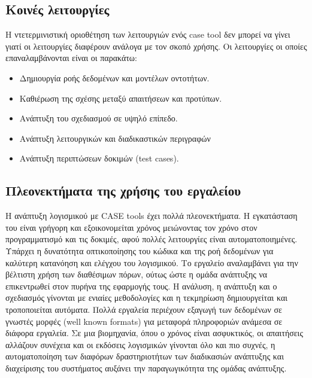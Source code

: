 \subsection{Kοινές λειτουργίες}
Η ντετερμινιστική οριοθέτηση των λειτουργιών ενός case tool δεν μπορεί να γίνει γιατί οι λειτουργίες διαφέρουν ανάλογα με τον σκοπό χρήσης. Οι λειτουργίες οι οποίες επαναλαμβάνονται είναι οι παρακάτω:
\begin{itemize}
	\item Δημιουργία ροής δεδομένων και μοντέλων οντοτήτων.
	\item Καθιέρωση της σχέσης μεταξύ απαιτήσεων και προτύπων.
	\item Ανάπτυξη του σχεδιασμού σε υψηλό επίπεδο.
	\item Ανάπτυξη λειτουργικών και διαδικαστικών περιγραφών
	\item Ανάπτυξη περιπτώσεων δοκιμών (test cases).	
\end{itemize}

\subsection{Πλεονεκτήματα της χρήσης του εργαλείου}
H ανάπτυξη λογισμικού με CASE tools έχει πολλά πλεονεκτήματα. Η εγκατάσταση του είναι γρήγορη και εξοικονομείται χρόνος μειώνοντας τον χρόνο στον προγραμματισμό και τις δοκιμές, αφού πολλές λειτουργίες είναι αυτοματοποιημένες. Υπάρχει η δυνατότητα οπτικοποίησης του κώδικα και της ροή δεδομένων για καλύτερη κατανόηση και ελέγχου του λογισμικού. Το εργαλείο αναλαμβάνει για την βέλτιστη χρήση των διαθέσιμων πόρων, ούτως ώστε η ομάδα ανάπτυξης να επικεντρωθεί στον πυρήνα της εφαρμογής τους. Η ανάλυση, η ανάπτυξη και ο σχεδιασμός γίνονται με ενιαίες μεθοδολογίες και η τεκμηρίωση δημιουργείται και τροποποιείται αυτόματα. Πολλά εργαλεία περιέχουν εξαγωγή των δεδομένων σε γνωστές μορφές (well known formats) για μεταφορά πληροφοριών ανάμεσα σε διάφορα εργαλεία. Σε μια βιομηχανία, όπου ο χρόνος είναι ασφυκτικός, οι απαιτήσεις αλλάζουν συνέχεια και οι εκδόσεις λογισμικών γίνονται όλο και πιο συχνές, η αυτοματοποίηση των διαφόρων δραστηριοτήτων των διαδικασιών ανάπτυξης και διαχείρισης του συστήματος αυξάνει την παραγωγικότητα της ομάδας ανάπτυξης.


